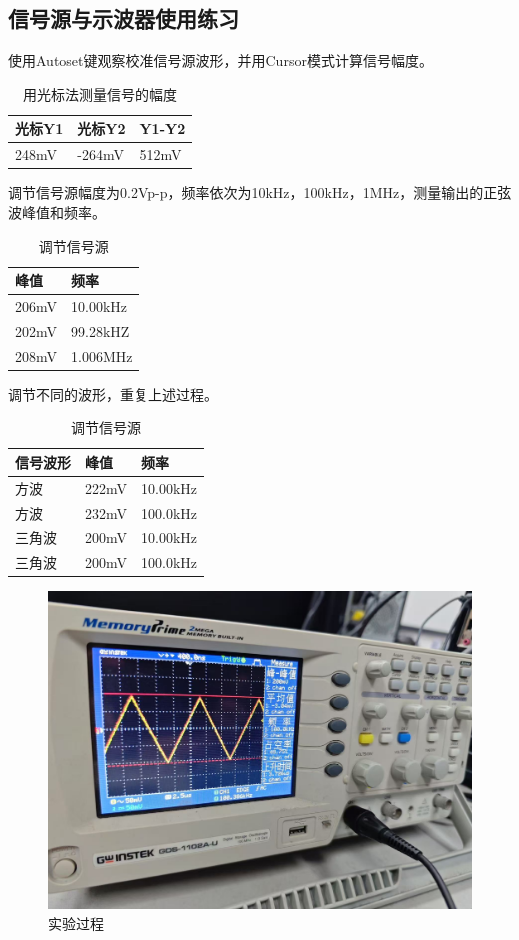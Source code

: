 \documentclass{zjureport}
\begin{document}
\subsection{信号源与示波器使用练习}
使用Autoset键观察校准信号源波形，并用Cursor模式计算信号幅度。
\begin{table}[H]
  \centering
  \caption{用光标法测量信号的幅度}
  \begin{tabular}{C{.3\textwidth}C{.3\textwidth}C{.3\textwidth}}
  \toprule
  光标Y1  & 光标Y2  & Y1-Y2 \\
  \midrule
  248mV & -264mV  & 512mV \\
  \bottomrule
  \end{tabular}
\end{table}
调节信号源幅度为0.2Vp-p，频率依次为10kHz，100kHz，1MHz，测量输出的正弦波峰值和频率。
\begin{table}[H]
  \centering
  \caption{调节信号源}
  \begin{tabular}{C{.4\textwidth}C{.4\textwidth}}
  \toprule
  峰值  & 频率 \\
  \midrule
  206mV & 10.00kHz \\
  202mV & 99.28kHZ \\
  208mV & 1.006MHz \\
  \bottomrule
  \end{tabular}
\end{table}
调节不同的波形，重复上述过程。
\begin{table}[H]
  \centering
  \caption{调节信号源}
  \begin{tabular}{C{.3\textwidth}C{.3\textwidth}C{.3\textwidth}}
  \toprule
  信号波形 & 峰值  & 频率 \\
  \midrule
  方波 & 222mV & 10.00kHz \\
  方波 & 232mV & 100.0kHz \\
  三角波 & 200mV & 10.00kHz \\
  三角波 & 200mV & 100.0kHz \\
  \bottomrule
  \end{tabular}
\end{table}
\begin{figure}[H]
\centering
\includegraphics[width = .7\textwidth]{./figures/微信图片_20250318113547.jpg}
\caption{实验过程}
\end{figure}
\end{document}
